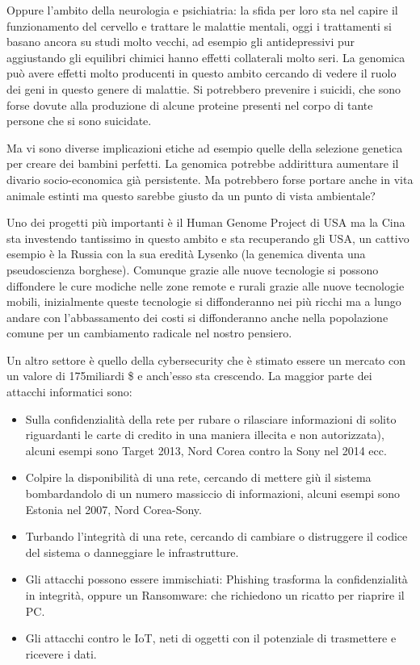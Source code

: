 \documentclass[]{article}
\begin{document}
Oppure l'ambito della neurologia e psichiatria: la sfida per loro sta
nel capire il funzionamento del cervello e trattare le malattie mentali,
oggi i trattamenti si basano ancora su studi molto vecchi, ad esempio
gli antidepressivi pur aggiustando gli equilibri chimici hanno effetti
collaterali molto seri. La genomica può avere effetti molto producenti
in questo ambito cercando di vedere il ruolo dei geni in questo genere
di malattie. Si potrebbero prevenire i suicidi, che sono forse dovute
alla produzione di alcune proteine presenti nel corpo di tante persone
che si sono suicidate.

Ma vi sono diverse implicazioni etiche ad esempio quelle della selezione
genetica per creare dei bambini perfetti. La genomica potrebbe
addirittura aumentare il divario socio-economica già persistente. Ma
potrebbero forse portare anche in vita animale estinti ma questo sarebbe
giusto da un punto di vista ambientale?

Uno dei progetti più importanti è il Human Genome Project di USA ma la
Cina sta investendo tantissimo in questo ambito e sta recuperando gli
USA, un cattivo esempio è la Russia con la sua eredità Lysenko (la
genemica diventa una pseudoscienza borghese). Comunque grazie alle nuove
tecnologie si possono diffondere le cure modiche nelle zone remote e
rurali grazie alle nuove tecnologie mobili, inizialmente queste
tecnologie si diffonderanno nei più ricchi ma a lungo andare con
l'abbassamento dei costi si diffonderanno anche nella popolazione comune
per un cambiamento radicale nel nostro pensiero.

Un altro settore è quello della cybersecurity che è stimato essere un
mercato con un valore di 175miliardi \$ e anch'esso sta crescendo. La
maggior parte dei attacchi informatici sono:

\begin{itemize}
	 
	\item
	Sulla confidenzialità della rete per rubare o rilasciare informazioni
	di solito riguardanti le carte di credito in una maniera illecita e
	non autorizzata), alcuni esempi sono Target 2013, Nord Corea contro la
	Sony nel 2014 ecc.
	\item
	Colpire la disponibilità di una rete, cercando di mettere giù il
	sistema bombardandolo di un numero massiccio di informazioni, alcuni
	esempi sono Estonia nel 2007, Nord Corea-Sony.
	\item
	Turbando l'integrità di una rete, cercando di cambiare o distruggere
	il codice del sistema o danneggiare le infrastrutture.
	\item
	Gli attacchi possono essere immischiati: Phishing trasforma la
	confidenzialità in integrità, oppure un Ransomware: che richiedono un
	ricatto per riaprire il PC.
	\item
	Gli attacchi contro le IoT, neti di oggetti con il potenziale di
	trasmettere e ricevere i dati.
\end{itemize}
\end{document}
